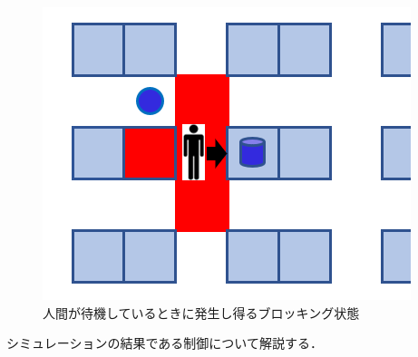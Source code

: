 \begin{figure}[!t]
    \centering
    \includegraphics[scale=0.3]{figures/HITL2_case2_human_waits_robot.png}
    \caption{人間が待機しているときに発生し得るブロッキング状態}
    \label{fig:HITL2_case2_human_waits_robot}
\end{figure}

シミュレーションの結果である制御について解説する．

